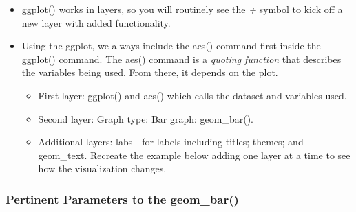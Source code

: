 \documentclass[
  letterpaper,
  DIV=11,
  numbers=noendperiod]{scrreprt}
\providecommand{\tightlist}{%
  \setlength{\itemsep}{0pt}\setlength{\parskip}{0pt}}\usepackage{longtable,booktabs,array}
\begin{document}
\begin{itemize}
\tightlist
\item
  ggplot() works in layers, so you will routinely see the \emph{+}
  symbol to kick off a new layer with added functionality.
\item
  Using the ggplot, we always include the aes() command first inside the
  ggplot() command. The aes() command is a \emph{quoting function} that
  describes the variables being used. From there, it depends on the
  plot.

  \begin{itemize}
  \tightlist
  \item
    First layer: ggplot() and aes() which calls the dataset and
    variables used.
  \item
    Second layer: Graph type: Bar graph: geom\_bar().
  \item
    Additional layers: labs - for labels including titles; themes; and
    geom\_text. Recreate the example below adding one layer at a time to
    see how the visualization changes.
  \end{itemize}
\end{itemize}

\subsubsection{Pertinent Parameters to the
geom\_bar()}\label{pertinent-parameters-to-the-geom_bar}
\end{document}
